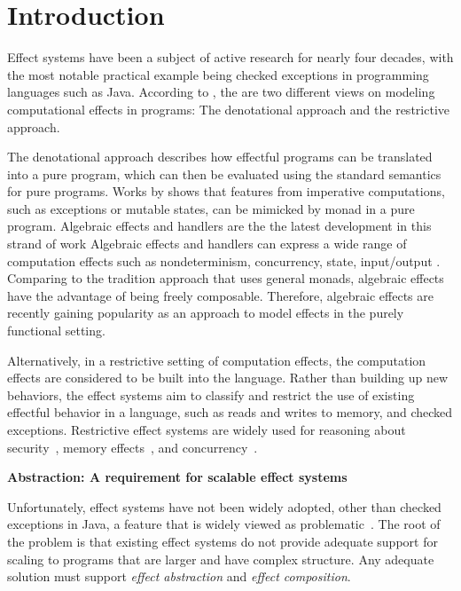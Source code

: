 
\chapter{Introduction}


Effect systems have been a subject of active research for nearly four decades, with the most notable practical example being checked exceptions in programming languages such as Java. According to \citet{filinski10}, the are two different views on modeling computational effects in programs: The denotational approach and the restrictive approach.

The denotational approach describes how effectful programs can be translated into a pure program, which can then be evaluated using the standard semantics for pure programs. Works by \citet{moggi89} shows that features from imperative computations, such as exceptions or mutable states, can be mimicked by monad in a pure program. Algebraic effects and handlers \cite{plotkin09} are the the latest development in this strand of work Algebraic effects and handlers can express a wide range of computation effects such as nondeterminism, concurrency, state, input/output \cite{plotkin09}. Comparing to the tradition approach that uses general monads, algebraic effects have the advantage of being freely composable. Therefore, algebraic effects are recently gaining popularity as an approach to model effects in the purely functional setting.

Alternatively, in a restrictive setting of computation effects, the computation effects are considered to be built into the language. Rather than building up new behaviors, the effect systems aim to classify and restrict the use of existing effectful behavior in a language, such as reads and writes to memory, and checked exceptions. Restrictive effect systems are widely used for reasoning about security~\cite{turbak08}, memory effects~\cite{lucassen88}, and concurrency~\cite{bocchino09,bracevac18,dolan17}. 

\noindent\textbf{Abstraction: A requirement for scalable effect systems}

 Unfortunately, effect systems have not been widely adopted, other than checked exceptions in Java, a feature that is widely viewed as problematic~\cite{10.1145/1103845.1094847}.  The root of the problem is that existing effect systems do not provide adequate support for scaling to programs that are larger and have complex structure.  Any adequate solution must support \textit{effect abstraction} and \textit{effect composition}.

